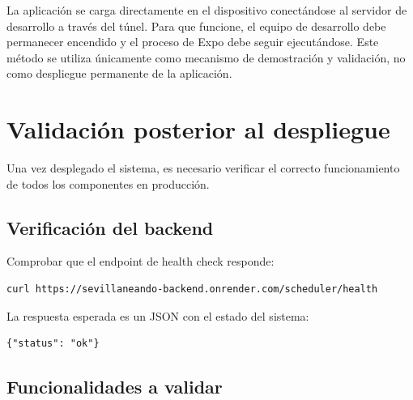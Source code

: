 La aplicación se carga directamente en el dispositivo conectándose al servidor de desarrollo a través del túnel. Para que funcione, el equipo de desarrollo debe permanecer encendido y el proceso de Expo debe seguir ejecutándose. Este método se utiliza únicamente como mecanismo de demostración y validación, no como despliegue permanente de la aplicación.

\section{Validación posterior al despliegue}

Una vez desplegado el sistema, es necesario verificar el correcto funcionamiento de todos los componentes en producción.

\subsection{Verificación del backend}

Comprobar que el endpoint de health check responde:

\begin{lstlisting}
curl https://sevillaneando-backend.onrender.com/scheduler/health
\end{lstlisting}

La respuesta esperada es un JSON con el estado del sistema:

\begin{lstlisting}
{"status": "ok"}
\end{lstlisting}

\subsection{Funcionalidades a validar}


